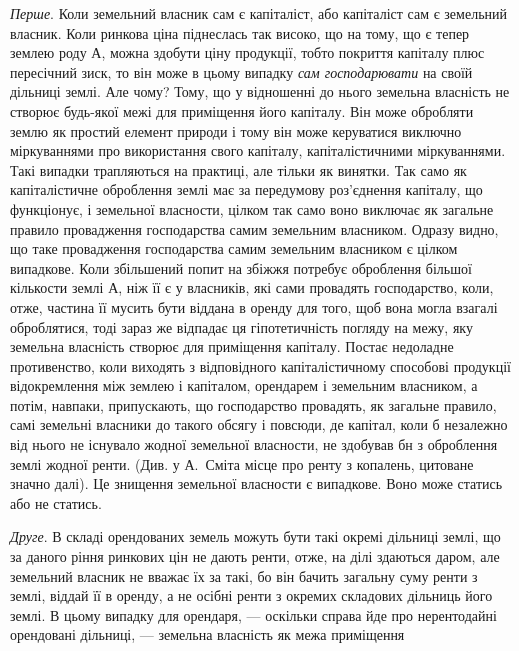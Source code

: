\emph{Перше}. Коли земельний власник сам є капіталіст, або капіталіст сам є
земельний власник. Коли ринкова ціна піднеслась так високо, що на тому,
що є тепер землею роду $А$, можна здобути ціну продукції, тобто покриття капіталу
плюс пересічний зиск, то він може в цьому випадку \emph{сам господарювати}
на своїй дільниці землі. Але чому? Тому, що у відношенні до нього земельна
власність не створює будь-якої межі для приміщення його капіталу.
Він може обробляти землю як простий елемент природи і тому він може керуватися
виключно міркуваннями про використання свого капіталу, капіталістичними
міркуваннями. Такі випадки трапляються на практиці, але тільки як винятки.
Так само як капіталістичне оброблення землі має за передумову роз’єднення капіталу,
що функціонує, і земельної власности, цілком так само воно виключає як
загальне правило провадження господарства самим земельним власником. Одразу
видно, що таке провадження господарства самим земельним власником є цілком
випадкове. Коли збільшений попит на збіжжя потребує оброблення більшої кількости
землі $А$, ніж її є у власників, які сами провадять господарство, коли, отже,
частина її мусить бути віддана в оренду для того, щоб вона могла взагалі оброблятися,
тоді зараз же відпадає ця гіпотетичність погляду на межу, яку земельна
власність створює для приміщення капіталу. Постає недоладне противенство,
коли виходять з відповідного капіталістичному способові продукції відокремлення
між землею і капіталом, орендарем і земельним власником, а потім,
навпаки, припускають, що господарство провадять, як загальне правило, самі
земельні власники до такого обсягу і повсюди, де капітал, коли б незалежно
від нього не існувало жодної земельної власности, не здобував бн з оброблення
землі жодної ренти. (Див. у А.~Сміта місце про ренту з копалень, цитоване
значно далі). Це знищення земельної власности є випадкове. Воно може статись
або не статись.

\emph{Друге}. В складі орендованих земель можуть бути такі окремі дільниці
землі, що за даного ріння ринкових цін не дають ренти, отже, на ділі здаються
даром, але земельний власник не вважає їх за такі, бо він бачить загальну суму
ренти з землі, віддай її в оренду, а не осібні ренти з окремих складових дільниць
його землі. В цьому випадку для орендаря, — оскільки справа йде про
нерентодайні орендовані дільниці, — земельна власність як межа приміщення
\parbreak{}  %
